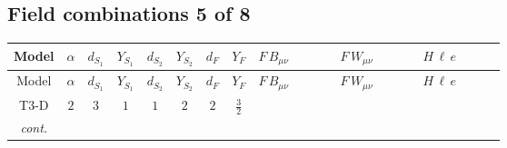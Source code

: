 \documentclass[8pt]{article}
\begin{document}
\begin{landscape}
\subsection*{Field combinations 5 of 8}
\begin{longtable}{@{}cccccccc >{\raggedright\arraybackslash}p{0.21\linewidth} >{\raggedright\arraybackslash}p{0.21\linewidth} >{\raggedright\arraybackslash}p{0.21\linewidth}@{}}
\toprule
Model & $\alpha$ & $d_{S_1}$ & $Y_{S_1}$ & $d_{S_2}$ & $Y_{S_2}$ & $d_F$ & $Y_F$ & $F\,B_{\mu\nu}$ & $F\,W_{\mu\nu}$ & $H\,\ell\,e$ \\
\midrule
\endfirsthead
\toprule
Model & $\alpha$ & $d_{S_1}$ & $Y_{S_1}$ & $d_{S_2}$ & $Y_{S_2}$ & $d_F$ & $Y_F$ & $F\,B_{\mu\nu}$ & $F\,W_{\mu\nu}$ & $H\,\ell\,e$ \\
\midrule
\endhead
T3-D & $2$ & $3$ & $1$ & $1$ & $2$ & $2$ & $\frac{3}{2}$ & \scriptsize\adjustbox{max width=\linewidth}{$\begin{gathered} -\frac{9}{2} \hbar  \log \left(\frac{\bar{\mu}^{2}}{M_F^2}\right) B_{\mu _1\mu _2}^2\end{gathered}$} & \scriptsize\adjustbox{max width=\linewidth}{$\begin{gathered} -\frac{1}{2} \hbar  \log \left(\frac{\bar{\mu}^{2}}{M_F^2}\right) \left(W_{\mu _1\mu _2}^{A_1}\right){}^2\end{gathered}$} & \scriptsize\adjustbox{max width=\linewidth}{$\begin{gathered} +\frac{\sqrt{3} \hbar  \overline{y_{1,i_3,r_1}} \overline{L_{a_1,i_2}}\, P_R\, e_{i_1} H_{a_1} y_{1,i_2,r_1} Y_{e,i_3,i_1}}{4 \epsilon } \\ +\frac{3}{8} \sqrt{3} \hbar  \overline{y_{1,i_3,r_1}} \overline{L_{a_1,i_2}}\, P_R\, e_{i_1} H_{a_1} y_{1,i_2,r_1} Y_{e,i_3,i_1} \\ +\frac{\hbar  \overline{y_{2,i_3,r_1}} \overline{L_{a_1,i_2}}\, P_R\, e_{i_1} H_{a_1} y_{2,i_2,r_1} Y_{e,i_3,i_1}}{4 \epsilon }\end{gathered}$} \\
\textit{cont.} &  &  &  &  &  &  &  &  &  & \scriptsize\adjustbox{max width=\linewidth}{$\begin{gathered} +\frac{3}{8} \hbar  \overline{y_{2,i_3,r_1}} \overline{L_{a_1,i_2}}\, P_R\, e_{i_1} H_{a_1} y_{2,i_2,r_1} Y_{e,i_3,i_1} \\ +\frac{\sqrt{3} \hbar  \overline{y_{1,i_1,r_1}} \overline{Y_{e,i_3,i_2}} \overline{e_{i_2}}\, P_L\, L_{a_1,i_1} y_{1,i_3,r_1} H_{a_1}{}^{\dagger }}{4 \epsilon } \\ +\frac{3}{8} \sqrt{3} \hbar  \overline{y_{1,i_1,r_1}} \overline{Y_{e,i_3,i_2}} \overline{e_{i_2}}\, P_L\, L_{a_1,i_1} y_{1,i_3,r_1} H_{a_1}{}^{\dagger }\end{gathered}$} \\

\end{longtable}
\end{landscape}
\end{document}

